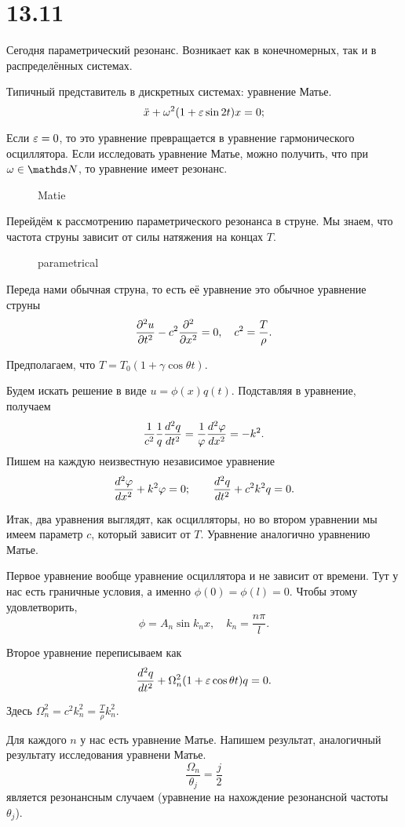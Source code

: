 \section{13.11}
Сегодня параметрический резонанс. Возникает как в конечномерных, так и в распределённых системах.

Типичный представитель в дискретных системах: уравнение Матье.
\[
  \ddot x + \omega^2(1+\varepsilon\sin 2t)x = 0;
\]

Если $\varepsilon = 0$, то это уравнение превращается в уравнение гармонического осциллятора. Если исследовать уравнение Матье, можно получить, что при $\omega \in \N$, то уравнение имеет резонанс.
\begin{figure}[H]
  \centering
  \caption{Matie}
  \label{fig:matie}
\end{figure}

Перейдём к рассмотрению параметрического резонанса в струне. Мы знаем, что частота струны зависит от силы натяжения на концах $T$.
\begin{figure}[H]
  \centering
  \caption{parametrical}
  \label{figja:<+label+>}
\end{figure}

Переда нами обычная струна, то есть её уравнение это обычное уравнение струны
\[
  \frac{\partial ^2u}{\partial t^2} - c^2 \frac{\partial ^2}{\partial x^2} = 0,\quad c^2 = \frac T\rho.
\]

Предполагаем, что $T = T_0(1 + \gamma \cos\theta t)$.

Будем искать решение в виде $u = \phi(x)  q(t)$. Подставляя в уравнение, получаем
\[
  \frac1{c^2}\frac1q\frac{d^2q}{dt^2} = \frac1{\varphi}\frac{d^2\varphi}{dx^2} = -k^2.
\]
Пишем на каждую неизвестную независимое уравнение
\[
  \frac{d^2\varphi}{dx^2} + k^2\varphi = 0;\qquad
  \frac{d^2q}{dt^2} + c^2 k^2q = 0.
\]

Итак, два уравнения выглядят, как осцилляторы, но во втором уравнении мы имеем параметр $c$, который зависит от $T$. Уравнение аналогично уравнению Матье.

Первое уравнение вообще уравнение осциллятора и не зависит от времени. Тут у нас есть граничные условия, а именно $\phi(0) = \phi(l) = 0$. Чтобы этому удовлетворить,
\[
  \phi = A_n \sin k_n x, \quad k_n = \frac{n\pi}l.
\]

Второе уравнение переписываем как
\[
  \frac{d^2q}{dt^2} + \Omega^2_n (1 + \varepsilon \cos\theta t)q = 0.
\]

Здесь $\Omega^2_n = c^2 k^2_n= \frac T\rho k^2_n$.

Для каждого $n$ у нас есть уравнение Матье.
Напишем результат, аналогичный результату исследования уравнени Матье.
\[
  \frac{\Omega_n}{\theta_j} = \frac j2
\]
является резонансным случаем (уравнение на нахождение резонансной частоты~$\theta_j$).

